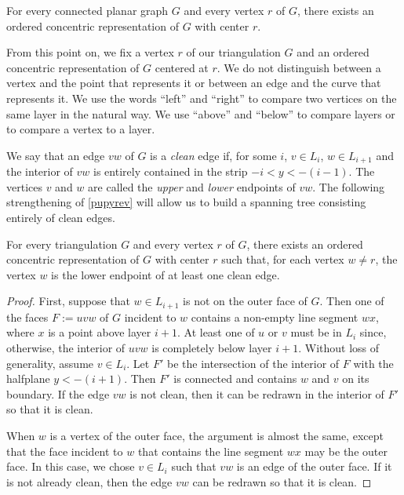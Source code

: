 \documentclass{patmorin}
\newcommand{\defin}[1]{\emph{\textcolor{brightmaroon}{#1}}}
\begin{document}
\begin{lem}\label{pupyrev}
  For every connected planar graph $G$ and every vertex $r$ of $G$, there exists an ordered concentric representation of $G$ with center $r$.
\end{lem}

From this point on, we fix a vertex $r$ of our triangulation $G$ and an ordered concentric representation of $G$ centered at $r$.  We do not distinguish between a vertex and the point that represents it or between an edge and the curve that represents it.  We use the words ``left'' and ``right'' to compare two vertices on the same layer in the natural way.  We use ``above'' and ``below'' to compare layers or to compare a vertex to a layer.

We say that an edge $vw$ of $G$ is a \defin{clean} edge if, for some $i$, $v\in L_i$, $w\in L_{i+1}$ and the interior of $vw$ is entirely contained in the strip $-i < y < -(i-1)$.  The vertices $v$ and $w$ are called the \defin{upper} and \defin{lower} endpoints of $vw$.  The following strengthening of \cref{pupyrev} will allow us to build a spanning tree consisting entirely of clean edges.

\begin{lem}\label{clean_edge}
  For every triangulation $G$ and every vertex $r$ of $G$, there exists an ordered concentric representation of $G$ with center $r$ such that, for each vertex $w\neq r$, the vertex $w$ is the lower endpoint of at least one clean edge.
\end{lem}

\begin{proof}
  First, suppose that $w\in L_{i+1}$ is not on the outer face of $G$.  Then one of the faces $F:=uvw$ of $G$ incident to $w$ contains a non-empty line segment $wx$, where $x$ is a point above layer $i+1$. At least one of $u$ or $v$ must be in $L_{i}$ since, otherwise, the interior of $uvw$ is completely below layer $i+1$. Without loss of generality, assume $v\in L_i$. Let $F'$ be the intersection of the interior of $F$ with the halfplane $y<-(i+1)$. Then $F'$ is connected and contains $w$ and $v$ on its boundary.  If the edge $vw$ is not clean, then it can be redrawn in the interior of $F'$ so that it is clean.

  When $w$ is a vertex of the outer face, the argument is almost the same, except that the face incident to $w$ that contains the line segment $wx$ may be the outer face.  In this case, we chose $v\in L_i$ such that $vw$ is an edge of the outer face. If it is not already clean, then the edge $vw$ can be redrawn so that it is clean.
\end{proof}
\end{document}
